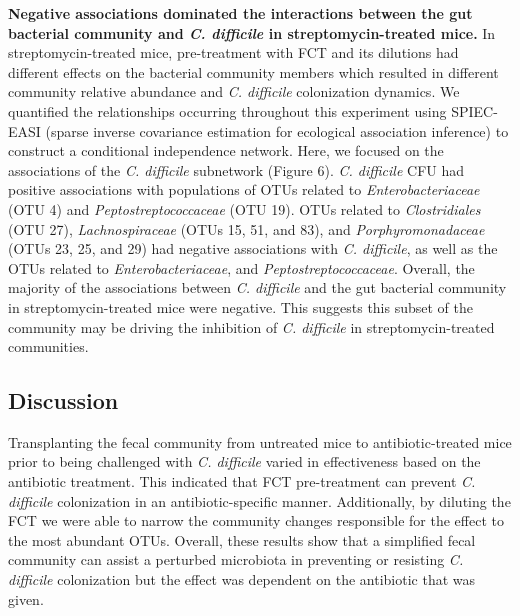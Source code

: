 \documentclass[
  12pt,
]{article}
\begin{document}
\textbf{Negative associations dominated the interactions between the gut
bacterial community and \emph{C. difficile} in streptomycin-treated
mice.} In streptomycin-treated mice, pre-treatment with FCT and its
dilutions had different effects on the bacterial community members which
resulted in different community relative abundance and \emph{C.
difficile} colonization dynamics. We quantified the relationships
occurring throughout this experiment using SPIEC-EASI (sparse inverse
covariance estimation for ecological association inference) to construct
a conditional independence network. Here, we focused on the associations
of the \emph{C. difficile} subnetwork (Figure 6). \emph{C. difficile}
CFU had positive associations with populations of OTUs related to
\emph{Enterobacteriaceae} (OTU 4) and \emph{Peptostreptococcaceae} (OTU
19). OTUs related to \emph{Clostridiales} (OTU 27),
\emph{Lachnospiraceae} (OTUs 15, 51, and 83), and
\emph{Porphyromonadaceae} (OTUs 23, 25, and 29) had negative
associations with \emph{C. difficile}, as well as the OTUs related to
\emph{Enterobacteriaceae}, and \emph{Peptostreptococcaceae}. Overall,
the majority of the associations between \emph{C. difficile} and the gut
bacterial community in streptomycin-treated mice were negative. This
suggests this subset of the community may be driving the inhibition of
\emph{C. difficile} in streptomycin-treated communities.

\hypertarget{discussion}{%
\subsection{Discussion}\label{discussion}}

Transplanting the fecal community from untreated mice to
antibiotic-treated mice prior to being challenged with \emph{C.
difficile} varied in effectiveness based on the antibiotic treatment.
This indicated that FCT pre-treatment can prevent \emph{C. difficile}
colonization in an antibiotic-specific manner. Additionally, by diluting
the FCT we were able to narrow the community changes responsible for the
effect to the most abundant OTUs. Overall, these results show that a
simplified fecal community can assist a perturbed microbiota in
preventing or resisting \emph{C. difficile} colonization but the effect
was dependent on the antibiotic that was given.
\end{document}
